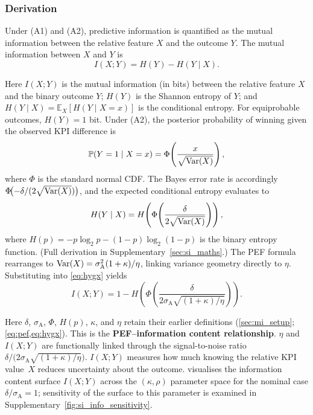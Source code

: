 \subsubsection{Derivation}

Under (A1) and (A2), predictive information is quantified as the mutual information between the relative feature $X$ and the outcome $Y$. The mutual information \parencite{shannon1948,cover2006} between $X$ and $Y$ is
\begin{equation}
  I(X;Y) = H(Y) - H(Y\mid X).
  \label{eq:mi_def}
\end{equation}

\noindent Here $I(X;Y)$ is the mutual information (in bits) between the relative feature $X$ and the binary outcome $Y$; $H(Y)$ is the Shannon entropy of $Y$; and $H(Y\mid X)=\mathbb{E}_{X}[H(Y\mid X=x)]$ is the conditional entropy. For equiprobable outcomes, $H(Y)=1$ bit. Under (A2), the posterior probability of winning given the observed KPI difference is
\[
  \mathbb{P}(Y=1\mid X=x) = \Phi\!\left(\frac{x}{\sqrt{\operatorname{Var}(X)}}\right),
\]
where $\Phi$ is the standard normal CDF. The Bayes error rate is accordingly $\Phi\!\bigl(-\delta/(2\sqrt{\operatorname{Var}(X)})\bigr)$, and the expected conditional entropy evaluates to
\begin{equation}
  H(Y\mid X) = H\!\left(\Phi\!\left(\frac{\delta}{2\sqrt{\operatorname{Var}(X)}}\right)\right),
  \label{eq:hygx}
\end{equation}
where $H(p)=-p\log_{2}p-(1-p)\log_{2}(1-p)$ is the binary entropy function. (Full derivation in Supplementary~\cref{sec:si_maths}.) The PEF formula rearranges to $\operatorname{Var}(X)=\sigma^{2}_{\mathrm{A}}(1+\kappa)/\eta$, linking variance geometry directly to $\eta$. Substituting into \cref{eq:hygx} yields
\begin{equation}
  I(X;Y) = 1 - H\!\left(\Phi\!\left(\frac{\delta}{2\sigma_{\mathrm{A}}\sqrt{(1+\kappa)/\eta}}\right)\right).
  \label{eq:mi_closed}
\end{equation}

\noindent Here $\delta$, $\sigma_{\mathrm{A}}$, $\Phi$, $H(p)$, $\kappa$, and $\eta$ retain their earlier definitions (\cref{sec:mi_setup}; \cref{eq:pef,eq:hygx}). This is the \textbf{PEF--information content relationship}. $\eta$ and $I(X;Y)$ are functionally linked through the signal-to-noise ratio $\delta/\bigl(2\sigma_{\mathrm{A}}\sqrt{(1+\kappa)/\eta}\bigr)$. $I(X;Y)$ measures how much knowing the relative KPI value~$X$ reduces uncertainty about the outcome.  visualises the information content surface $I(X;Y)$ across the $(\kappa,\rho)$ parameter space for the nominal case $\delta/\sigma_{\mathrm{A}}=1$; sensitivity of the surface to this parameter is examined in Supplementary~\cref{fig:si_info_sensitivity}.

